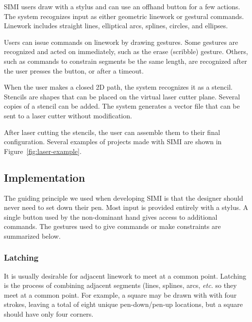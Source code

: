 \documentclass{article}
\begin{document}


SIMI users draw with a stylus and can use an offhand button for a few
actions. The system recognizes input as either geometric linework or
gestural commands. Linework includes straight lines, elliptical arcs,
splines, circles, and ellipses. 

Users can issue commands on linework by drawing gestures. Some
gestures are recognized and acted on immediately, such as the erase
(scribble) gesture. Others, such as commands to constrain segments be
the same length, are recognized after the user presses the button, or
after a timeout.

When the user makes a closed 2D path, the system recognizes it as a
stencil. Stencils are shapes that can be placed on the virtual laser
cutter plane. Several copies of a stencil can be added. The system
generates a vector file that can be sent to a laser cutter without
modification.

After laser cutting the stencils, the user can assemble them to their
final configuration. Several examples of projects made with SIMI are
shown in Figure~\ref{fig:laser-example}.

\subsection{Implementation}


The guiding principle we used when developing SIMI is that the
designer should never need to set down their pen. Most input is
provided entirely with a stylus. A single button used by the
non-dominant hand gives access to additional commands. The gestures
used to give commands or make constraints are summarized below.

\subsubsection{Latching}

It is usually desirable for adjacent linework to meet at a common
point. Latching is the process of combining adjacent segments (lines,
splines, arcs, \textit{etc.} so they meet at a common point. For
example, a square may be drawn with with four strokes, leaving a total
of eight unique pen-down/pen-up locations, but a square should have
only four corners.
\end{document}
